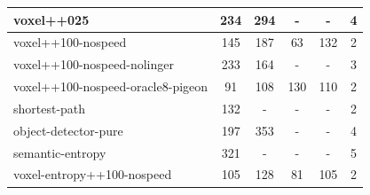 \begin{longtable}{|l|c|c| c|c|c|}


voxel++025 & {\cellcolor[HTML]{C2DFD9}} \color[HTML]{000000} 234 & {\cellcolor[HTML]{D2E6E2}} \color[HTML]{000000} 294 &    -     & - & {\cellcolor[HTML]{91C7BC}} \color[HTML]{000000} 4 \\ \hline
voxel++100-nospeed & {\cellcolor[HTML]{98CAC0}} \color[HTML]{000000} 145 & {\cellcolor[HTML]{A4D0C7}} \color[HTML]{000000} 187 & {\cellcolor[HTML]{8EC5BA}} \color[HTML]{000000} 63 & {\cellcolor[HTML]{92C7BC}} \color[HTML]{000000} 132 & {\cellcolor[HTML]{55AA99}} \color[HTML]{000000} 2 \\ \hline
voxel++100-nospeed-nolinger & {\cellcolor[HTML]{C1DED8}} \color[HTML]{000000} 233 & {\cellcolor[HTML]{9ACBC1}} \color[HTML]{000000} 164 &    -     & - & {\cellcolor[HTML]{61B0A0}} \color[HTML]{000000} 3 \\ \hline
voxel++100-nospeed-oracle8-pigeon & {\cellcolor[HTML]{7FBEB1}} \color[HTML]{000000} 91 & {\cellcolor[HTML]{82C0B3}} \color[HTML]{000000} 108 & {\cellcolor[HTML]{CDE4DF}} \color[HTML]{000000} 130 & {\cellcolor[HTML]{87C2B6}} \color[HTML]{000000} 110 & {\cellcolor[HTML]{55AA99}} \color[HTML]{000000} 2 \\ \hline
shortest-path & {\cellcolor[HTML]{92C7BC}} \color[HTML]{000000} 132 &    -     &    -     & - & {\cellcolor[HTML]{55AA99}} \color[HTML]{000000} 2 \\ \hline
object-detector-pure & {\cellcolor[HTML]{B0D6CE}} \color[HTML]{000000} 197 & {\cellcolor[HTML]{EBF2F0}} \color[HTML]{000000} 353 &    -     &  - & {\cellcolor[HTML]{95C9BE}} \color[HTML]{000000} 4 \\ \hline
semantic-entropy & {\cellcolor[HTML]{EBF2F0}} \color[HTML]{000000} 321 &    -     &    -     & - & {\cellcolor[HTML]{EBF2F0}} \color[HTML]{000000} 5 \\ \hline
voxel-entropy++100-nospeed & {\cellcolor[HTML]{85C1B5}} \color[HTML]{000000} 105 & {\cellcolor[HTML]{8BC4B8}} \color[HTML]{000000} 128 & {\cellcolor[HTML]{9FCEC4}} \color[HTML]{000000} 81 & {\cellcolor[HTML]{85C1B5}} \color[HTML]{000000} 105 & {\cellcolor[HTML]{55AA99}} \color[HTML]{000000} 2 \\ \hline

\end{longtable}
